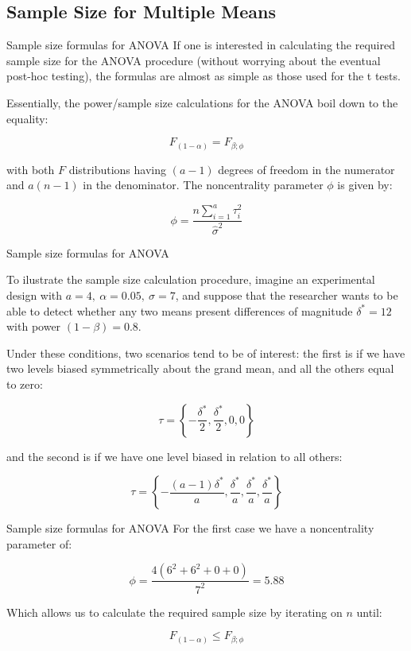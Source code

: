 \subsection{Sample Size for Multiple Means}

\begin{frame}{Sample size formulas for ANOVA}
If one is interested in calculating the required sample size for the ANOVA procedure (without worrying about the eventual post-hoc testing), the formulas are almost as simple as those used for the t tests.\bigskip

Essentially, the power/sample size calculations for the ANOVA boil down to the equality:

\begin{equation*}
F_{(1-\alpha)} = F_{\beta;\phi}
\end{equation*}

with both $F$ distributions having $(a-1)$ degrees of freedom in the numerator and $a(n-1)$ in the denominator. The noncentrality parameter $\phi$ is given by:

\begin{equation*}
\phi = \frac{n\sum\limits_{i=1}^{a}\tau_i^2}{\hat{\sigma}^2}
\end{equation*}
\end{frame}

\begin{frame}{Sample size formulas for ANOVA}

To ilustrate the sample size calculation procedure, imagine an experimental design with $a = 4,\ \alpha = 0.05,\ \hat{\sigma} = 7$, and suppose that the researcher wants to be able to detect whether any two means present differences of magnitude $\delta^* = 12$ with power $(1-\beta)=0.8$.\bigskip

Under these conditions, two scenarios tend to be of interest: the first is if we have two levels biased symmetrically about the grand mean, and all the others equal to zero:

$$ \tau = \left\{-\frac{\delta^*}{2}, \frac{\delta^*}{2}, 0, 0\right\}$$

\noindent and the second is if we have one level biased in relation to all others:

$$ \tau = \left\{-\frac{(a-1)\delta^*}{a}, \frac{\delta^*}{a}, \frac{\delta^*}{a}, \frac{\delta^*}{a}\right\}$$
\end{frame}

\begin{frame}{Sample size formulas for ANOVA}
For the first case we have a noncentrality parameter of:

$$\phi = \frac{4\left(6^2+6^2+0+0\right)}{7^2} = 5.88$$

Which allows us to calculate the required sample size by iterating on $n$ until:

$$F_{(1-\alpha)} \leq F_{\beta;\phi}$$

\end{frame}

